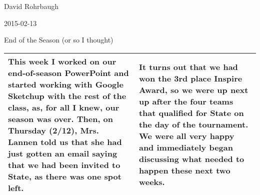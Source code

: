 David Rohrbaugh

2015-02-13

End of the Season (or so I thought)

\begin{tabular}{|p{5cm}|p{5cm}|}
 \hline
 This week I worked on our end-of-season PowerPoint and started working with Google Sketchup with the rest of the class, as, for all I knew, our season was over. Then, on Thursday (2/12), Mrs. Lannen told us that she had just gotten an email saying that we had been invited to State, as there was one spot left.
 &
  It turns out that we had won the 3rd place Inspire Award, so we were up next up after the four teams that qualified for State on the day of the tournament. We were all very happy and immediately began discussing what needed to happen these next two weeks.
 \\
 \hline
\end{tabular}
